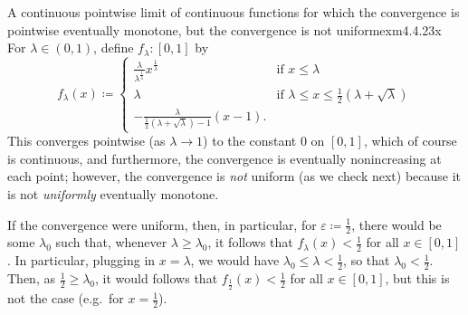 \begin{exm}{A continuous pointwise limit of continuous functions for which the convergence is pointwise eventually monotone, but the convergence is not uniform}{exm4.4.23x}
For $\lambda \in (0,1)$, define $f_{\lambda}\colon [0,1]$ by
\begin{equation}
f_{\lambda}(x)\coloneqq \begin{cases}\frac{\lambda}{\lambda ^{\tfrac{1}{\lambda}}}x^{\tfrac{1}{\lambda}} & \text{if }x\leq \lambda  \\ \lambda & \text{if }\lambda \leq x\leq \tfrac{1}{2}(\lambda +\sqrt{\lambda}) \\ -\frac{\lambda}{\tfrac{1}{2}(\lambda +\sqrt{\lambda})-1}(x-1).\end{cases}
\end{equation}
This converges pointwise (as $\lambda \to 1$) to the constant $0$ on $[0,1]$, which of course is continuous, and furthermore, the convergence is eventually nonincreasing at each point; however, the convergence is \emph{not} uniform (as we check next) because it is not \emph{uniformly} eventually monotone.

If the convergence were uniform, then, in particular, for $\varepsilon \coloneqq \frac{1}{2}$, there would be some $\lambda _0$ such that, whenever $\lambda \geq \lambda _0$, it follows that $f_{\lambda}(x)<\frac{1}{2}$ for all $x\in [0,1]$.  In particular, plugging in $x=\lambda$, we would have $\lambda _0\leq \lambda <\frac{1}{2}$, so that $\lambda _0<\frac{1}{2}$.  Then, as $\frac{1}{2}\geq \lambda _0$, it would follows that $f_{\frac{1}{2}}(x)<\frac{1}{2}$ for all $x\in [0,1]$, but this is not the case (e.g.~for $x=\frac{1}{2}$).
\end{exm}
